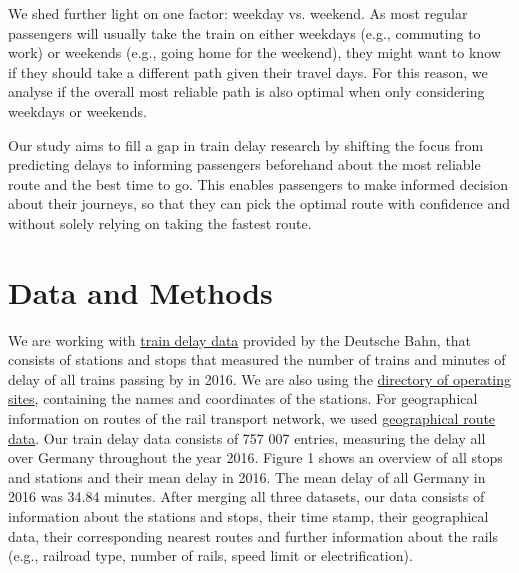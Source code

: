 \documentclass{article}
\theoremstyle{plain}
\theoremstyle{definition}
\theoremstyle{remark}
\begin{document}
We shed further light on one factor: weekday vs. weekend. As most regular passengers will usually take the train on either weekdays (e.g., commuting to work) or weekends (e.g., going home for the weekend), they might want to know if they should take a different path given their travel days. For this reason, we analyse if the overall most reliable path is also optimal when only considering weekdays or weekends.

Our study aims to fill a gap in train delay research by shifting the focus from predicting delays to informing passengers beforehand about the most reliable route and the best time to go. This enables passengers to make informed decision about their journeys, so that they can pick the optimal route with confidence and without solely relying on taking the fastest route.


\section{Data and Methods}\label{sec:methods}

We are working with \href{https://data.deutschebahn.com/dataset/ist-verkehrsdaten-der-db-cargo-auf-bst8-ebene.html}{train delay data} provided by the Deutsche Bahn, that consists of stations and stops that measured the number of trains and minutes of delay of all trains passing by in 2016. We are also using the \href{https://data.deutschebahn.com/dataset/betriebsstellen-gueterverkehr.html}{directory of operating sites}, containing the names and coordinates of the stations. For geographical information on routes of the rail transport network, we used \href{https://data.deutschebahn.com/dataset/betriebsstellen-gueterverkehr.html}{geographical route data}. Our train delay data consists of 757 007 entries, measuring the delay all over Germany throughout the year 2016. Figure 1 shows an overview of all stops and stations and their mean delay in 2016. The mean delay of all Germany in 2016 was 34.84 minutes. After merging all three datasets, our data consists of information about the stations and stops, their time stamp, their geographical data, their corresponding nearest routes and further information about the rails (e.g., railroad type, number of rails, speed limit or electrification).
\end{document}
